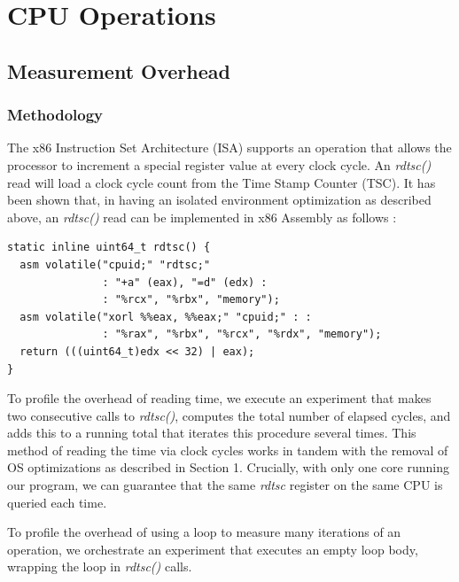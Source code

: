 \documentclass[sigconf]{acmart}
\begin{document}
\section{CPU Operations}

\subsection{Measurement Overhead}
\subsubsection{Methodology}
The x86 Instruction Set Architecture (ISA) supports an operation that allows the processor to increment a special register value at every clock cycle. An \textit{rdtsc()} read will load a clock cycle count from the Time Stamp Counter (TSC). It has been shown \cite{isa} \cite{intelProfiling} that, in having an isolated environment optimization as described above, an \textit{rdtsc()} read can be implemented in x86 Assembly as follows \cite{bahra_2013}:

\begin{lstlisting}
static inline uint64_t rdtsc() {
  asm volatile("cpuid;" "rdtsc;" 
               : "+a" (eax), "=d" (edx) : 
               : "%rcx", "%rbx", "memory");
  asm volatile("xorl %%eax, %%eax;" "cpuid;" : : 
               : "%rax", "%rbx", "%rcx", "%rdx", "memory");
  return (((uint64_t)edx << 32) | eax);
}
\end{lstlisting}

To profile the overhead of reading time, we execute an experiment that makes two consecutive calls to \textit{rdtsc()}, computes the total number of elapsed cycles, and adds this to a running total that iterates this procedure several times. This method of reading the time via clock cycles works in tandem with the removal of OS optimizations as described in Section 1. Crucially, with only one core running our program, we can guarantee that the same \textit{rdtsc} register on the same CPU is queried each time. 

To profile the overhead of using a loop to measure many iterations of an operation, we orchestrate an experiment that executes an empty loop body, wrapping the loop in \textit{rdtsc()} calls.
\end{document}
